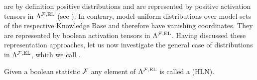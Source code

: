 %
%




\sect{\HybridLogicNetworks{}}\label{sec:hybridNetworks}

\MarkovLogicNetworks{} are by definition positive distributions and are represented by positive activation tensors in $\Lambda^{\mathcal{F},\mathrm{EL}}$ (see ).
In contrary, \HardLogicNetworks{} model uniform distributions over model sets of the respective Knowledge Base and therefore have vanishing coordinates.
They are represented by boolean activation tensors in $\Lambda^{\mathcal{F},\mathrm{EL}}$.
Having discussed these representation approaches, let us now investigate the general case of distributions in $\Lambda^{\mathcal{F},\mathrm{EL}}$, which we call \HybridLogicNetworks{}.


\begin{definition}[\HybridLogicNetwork{}]
    \label{def:hln}
    Given a boolean statistic $\mathcal{F}$ %
    any element of $\Lambda^{\mathcal{F},\mathrm{EL}}$ is called a \HybridLogicNetwork{} (HLN).
\end{definition}

